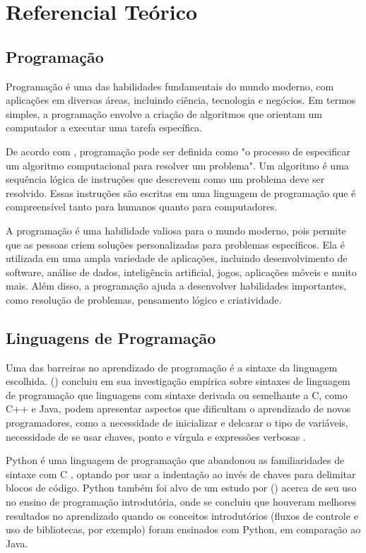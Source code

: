 \chapter[Referencial Teórico]{Referencial Teórico}

\section{Programação}

Programação é uma das habilidades fundamentais do mundo moderno, com aplicações em diversas áreas, incluindo ciência, tecnologia e negócios. Em termos simples, a programação envolve a criação de algoritmos que orientam um computador a executar uma tarefa específica.

De acordo com \cite{VanRoy2004}, programação pode ser definida como "o processo de especificar um algoritmo computacional para resolver um problema". Um algoritmo é uma sequência lógica de instruções que descrevem como um problema deve ser resolvido. Essas instruções são escritas em uma linguagem de programação que é compreensível tanto para humanos quanto para computadores.

A programação é uma habilidade valiosa para o mundo moderno, pois permite que as pessoas criem soluções personalizadas para problemas específicos. Ela é utilizada em uma ampla variedade de aplicações, incluindo desenvolvimento de software, análise de dados, inteligência artificial, jogos, aplicações móveis e muito mais. Além disso, a programação ajuda a desenvolver habilidades importantes, como resolução de problemas, pensamento lógico e criatividade.

\section{Linguagens de Programação}

Uma das barreiras no aprendizado de programação é a sintaxe da linguagem escolhida. \citeauthor{stefik2013} (\citeyear{stefik2013}) concluiu em sua investigação empírica sobre sintaxes de linguagem de programação que linguagens com sintaxe derivada ou semelhante a C, como C++ e Java, podem apresentar aspectos que dificultam o aprendizado de novos programadores, como a necessidade de inicializar e delcarar o tipo de variáveis, necessidade de se usar chaves, ponto e vírgula e expressões verbosas \cite{mannila2006}.

Python é uma linguagem de programação que abandonou as familiaridades de sintaxe com C \cite{stefik2013}, optando por usar a indentação ao invés de chaves para delimitar blocos de código. Python também foi alvo de um estudo por \citeauthor{jayal2015} (\citeyear{jayal2015}) acerca de seu uso no ensino de programação introdutória, onde se concluiu que houveram melhores resultados no aprendizado quando os conceitos introdutórios (fluxos de controle e uso de bibliotecas, por exemplo) foram ensinados com Python, em comparação ao Java.

